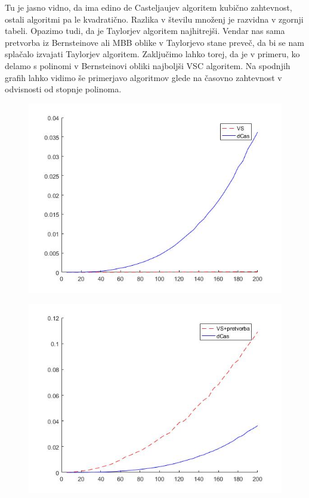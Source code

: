 \documentclass{article}
\begin{document}
Tu je jasno vidno, da ima edino de Casteljaujev algoritem kubično zahtevnost, ostali algoritmi pa le kvadratično. Razlika v številu množenj je razvidna v zgornji tabeli. Opazimo tudi, da je Taylorjev algoritem najhitrejši. Vendar nas sama pretvorba iz Bernsteinove ali MBB oblike v Taylorjevo stane preveč, da bi se nam splačalo izvajati Taylorjev algoritem. Zaključimo lahko torej, da je v primeru, ko delamo s polinomi v Bernsteinovi obliki najboljši VSC algoritem.
Na spodnjih grafih lahko vidimo še primerjavo algoritmov glede na časovno zahtevnost v odvisnosti od stopnje polinoma.
\begin{figure}[h]
\centering
\begin{minipage}{.5\textwidth}
\centering
 \includegraphics[scale=0.3]{vs}
\label{fig:vs}
\end{minipage}%
\begin{minipage}{.5\textwidth}
\centering
 \includegraphics[scale=0.3]{vs_potratn.jpg}
\label{fig:vspot}
\end{minipage}
\end{figure}
\end{document}
